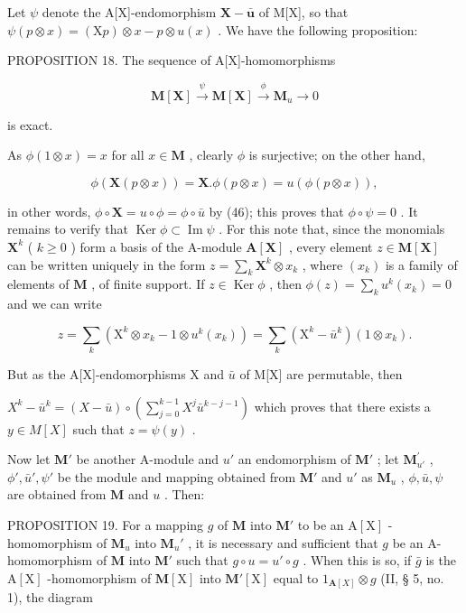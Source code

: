 Let \(\psi\) denote the A{[}X{]}-endomorphism \(\mathbf{X} - \bar{\boldsymbol{u}}\) of M{[}X{]}, so that \(\psi(p \otimes x) = (\mathrm{X}p) \otimes x - p \otimes u(x)\) . We have the following proposition:

PROPOSITION 18. The sequence of A{[}X{]}-homomorphisms

\[
\mathbf {M} [ \mathbf {X} ] \stackrel {\psi} {\longrightarrow} \mathbf {M} [ \mathbf {X} ] \stackrel {\phi} {\longrightarrow} \mathbf {M} _ {u} \longrightarrow 0\tag{47}
\]

is exact.

As \(\phi(1 \otimes x) = x\) for all \(x \in \mathbf{M}\) , clearly \(\phi\) is surjective; on the other hand,

\[
\phi (\mathbf {X} (p \otimes x)) = \mathbf {X}. \phi (p \otimes x) = u (\phi (p \otimes x)),
\]

in other words, \(\phi \circ \mathbf{X} = u \circ \phi = \phi \circ \bar{u}\) by (46); this proves that \(\phi \circ \psi = 0\) . It remains to verify that \(\operatorname{Ker} \phi \subset \operatorname{Im} \psi\) . For this note that, since the monomials \(\mathbf{X}^k\) ( \(k \geqslant 0\) ) form a basis of the A-module \(\mathbf{A}[\mathbf{X}]\) , every element \(z \in \mathbf{M}[\mathbf{X}]\) can be written uniquely in the form \(z = \sum_k \mathbf{X}^k \otimes x_k\) , where \((x_k)\) is a family of elements of \(\mathbf{M}\) , of finite support. If \(z \in \operatorname{Ker} \phi\) , then \(\phi(z) = \sum_k u^k(x_k) = 0\) and we can write

\[
z = \sum_ {k} \left(\mathrm{X} ^ {k} \otimes x _ {k} - 1 \otimes u ^ {k} (x _ {k})\right) = \sum_ {k} \left(\mathrm{X} ^ {k} - \bar {u} ^ {k}\right) (1 \otimes x _ {k}).
\]

But as the A{[}X{]}-endomorphisms X and \(\bar{u}\) of M{[}X{]} are permutable, then

\(X^{k}-\bar{u}^{k}=(X-\bar{u})\circ\left(\sum_{j=0}^{k-1}X^{j}\bar{u}^{k-j-1}\right)\) which proves that there exists a \(y\in M[X]\) such that \(z=\psi(y)\) .

Now let \(\mathbf{M}'\) be another A-module and \(u'\) an endomorphism of \(\mathbf{M}'\) ; let \(\mathbf{M}_{u'}^{\prime}\) , \(\phi', \bar{u}', \psi'\) be the module and mapping obtained from \(\mathbf{M}'\) and \(u'\) as \(\mathbf{M}_u\) , \(\phi, \bar{u}, \psi\) are obtained from \(\mathbf{M}\) and \(u\) . Then:

PROPOSITION 19. For a mapping \(g\) of \(\mathbf{M}\) into \(\mathbf{M}'\) to be an \(\mathrm{A}[\mathrm{X}]\) -homomorphism of \(\mathbf{M}_u\) into \(\mathbf{M}_u'\) , it is necessary and sufficient that \(g\) be an A-homomorphism of \(\mathbf{M}\) into \(\mathbf{M}'\) such that \(g \circ u = u' \circ g\) . When this is so, if \(\bar{g}\) is the \(\mathrm{A}[\mathrm{X}]\) -homomorphism of \(\mathbf{M}[\mathrm{X}]\) into \(\mathbf{M}'[\mathrm{X}]\) equal to \(1_{\mathbf{A}[X]} \otimes g\) (II, § 5, no. 1), the diagram

